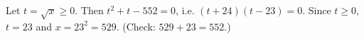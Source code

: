 Let $t=\sqrt x\ge0$. Then $t^2+t-552=0$, i.e. $(t+24)(t-23)=0$. Since $t\ge0$, $t=23$ and $x=23^2=\boxed{529}$. (Check: $529+23=552$.)
